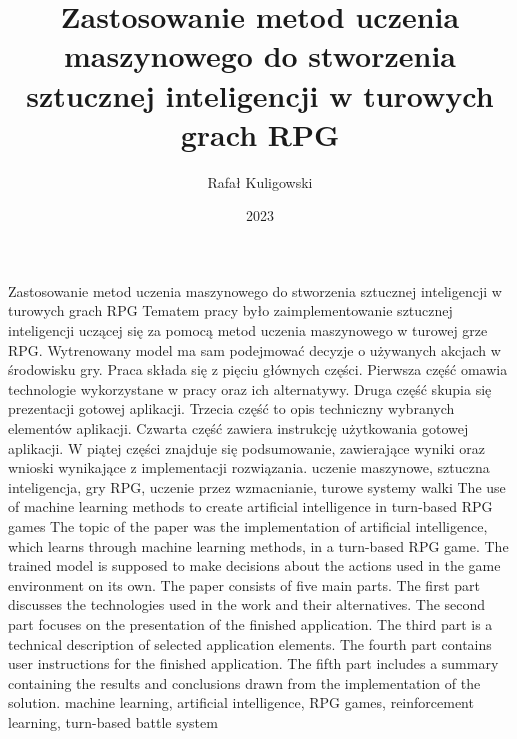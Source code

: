 \documentclass{SGGW-thesis}
\title{Zastosowanie metod uczenia maszynowego do stworzenia sztucznej inteligencji w turowych grach RPG}
\author{Rafał Kuligowski}
\date{2023}
\begin{document}
\makeatletter
\g@addto@macro{\UrlBreaks}{%
\do\/\do\a\do\b\do\c\do\d\do\e\do\f%
\do\g\do\h\do\i\do\j\do\k\do\l\do\m%
\do\n\do\o\do\p\do\q\do\r\do\s\do\t%
\do\u\do\v\do\w\do\x\do\y\do\z%
\do\A\do\B\do\C\do\D\do\E\do\F\do\G%
\do\H\do\I\do\J\do\K\do\L\do\M\do\N%
\do\O\do\P\do\Q\do\R\do\S\do\T\do\U%
\do\V\do\W\do\X\do\Y\do\Z}
\makeatother

\maketitle
\statementpage
\abstractpage
{Zastosowanie metod uczenia maszynowego do stworzenia sztucznej inteligencji w turowych grach RPG}
{Tematem pracy było zaimplementowanie sztucznej inteligencji uczącej się za pomocą metod uczenia maszynowego w turowej grze RPG. 
Wytrenowany model ma sam podejmować decyzje o używanych akcjach w środowisku gry. Praca składa się z pięciu głównych części.
Pierwsza część omawia technologie wykorzystane w pracy oraz ich alternatywy. Druga część skupia się prezentacji gotowej aplikacji.
Trzecia część to opis techniczny wybranych elementów aplikacji. Czwarta część zawiera instrukcję użytkowania gotowej aplikacji. 
W piątej części znajduje się podsumowanie, zawierające wyniki oraz wnioski wynikające z implementacji rozwiązania.}
{uczenie maszynowe, sztuczna inteligencja, gry RPG, uczenie przez wzmacnianie, turowe systemy walki}
{The use of machine learning methods to create artificial intelligence in turn-based RPG games}
{The topic of the paper was the implementation of artificial intelligence, which learns through machine learning methods, in a turn-based RPG game.
The trained model is supposed to make decisions about the actions used in the game environment on its own.
The paper consists of five main parts. The first part discusses the technologies used in the work and their alternatives. The second part focuses on the presentation of the finished application.
The third part is a technical description of selected application elements. The fourth part contains user instructions for the finished application. The fifth part includes 
a summary containing the results and conclusions drawn from the implementation of the solution.}
{machine learning, artificial intelligence, RPG games, reinforcement learning, turn-based battle system}


{
  \doublespacing
  \tableofcontents
}
\end{document}
